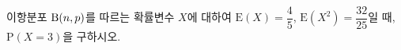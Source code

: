 이항분포 $\mathrm{B}(n{,}\mkern3mu\mathopen{}p)$를 따르는 확률변수 $X$에 대하여 $\mathrm{E}(X)=\dfrac{4}{5}$, $\mathrm{E}(X^2)=\dfrac{32}{25}$일 때, $\mathrm{P}(X=3)$을 구하시오.
